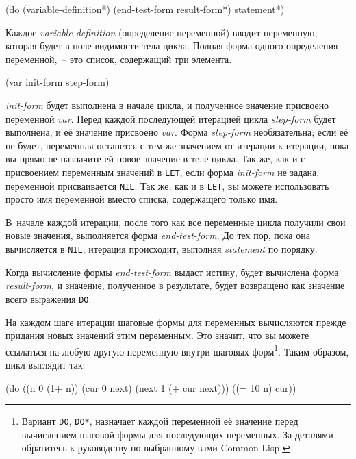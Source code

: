 \begin{myverb}
(do (variable-definition*)
    (end-test-form result-form*)
  statement*)
\end{myverb}

Каждое \textit{variable-definition} (определение переменной) вводит переменную, которая
будет в поле видимости тела цикла. Полная форма одного определения переменной,~-- это список,
содержащий три элемента.

\begin{myverb}
(var init-form step-form)
\end{myverb}

\noindent{}\textit{init-form} будет выполнена в начале цикла, и полученное значение присвоено
переменной \textit{var}.  Перед каждой последующей итерацией цикла \textit{step-form}
будет выполнена, и её значение присвоено \textit{var}.  Форма \textit{step-form}
необязательна; если её не будет, переменная останется с тем же значением от итерации к
итерации, пока вы прямо не назначите ей новое значение в теле цикла. Так же, как и с
присвоением переменным значений в \lstinline{LET}, если форма \textit{init-form} не задана,
переменной присваивается \lstinline{NIL}. Так же, как и в \lstinline{LET}, вы можете использовать
просто имя переменной вместо списка, содержащего только имя.

В~начале каждой итерации, после того как все переменные цикла получили свои новые
значения, выполняется форма \textit{end-test-form}. До тех пор, пока она вычисляется в
\lstinline{NIL}, итерация происходит, выполняя \textit{statement} по порядку.

Когда вычисление формы \textit{end-test-form} выдаст истину, будет вычислена форма
\textit{result-form}, и значение, полученное в результате, будет возвращено как значение
всего выражения \lstinline{DO}.

На каждом шаге итерации шаговые формы для переменных вычисляются прежде придания новых
значений этим переменным. Это значит, что вы можете ссылаться на любую другую переменную
внутри шаговых форм\footnote{Вариант \lstinline{DO}, \lstinline{DO*}, назначает каждой переменной
  её значение перед вычислением шаговой формы для последующих переменных. За деталями
  обратитесь к руководству по выбранному вами Common Lisp.}\hspace{\footnotenegspace}. Таким образом, цикл выглядит
так:

\begin{myverb}
(do ((n 0 (1+ n))
     (cur 0 next)
     (next 1 (+ cur next)))
    ((= 10 n) cur))
\end{myverb}

